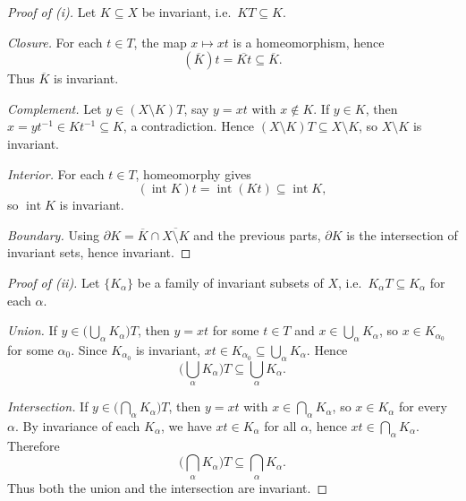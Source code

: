 \begin{mynote}
    \begin{proof}[Proof of (i)]
        Let $K\subseteq X$ be invariant, i.e.\ $K T\subseteq K$.

        \emph{Closure.} For each $t\in T$, the map $x\mapsto xt$ is a homeomorphism, hence
        \[
            (\overline{K})t=\overline{Kt}\subseteq \overline{K}.
        \]
        Thus $\overline{K}$ is invariant.

        \emph{Complement.} Let $y\in (X\setminus K)T$, say $y=xt$ with $x\notin K$. If $y\in K$, then
        $x= y t^{-1}\in Kt^{-1}\subseteq K$, a contradiction. Hence $(X\setminus K)T\subseteq X\setminus K$,
        so $X\setminus K$ is invariant.

        \emph{Interior.} For each $t\in T$, homeomorphy gives
        \[
            (\operatorname{int}K)t=\operatorname{int}(Kt)\subseteq \operatorname{int}K,
        \]
        so $\operatorname{int}K$ is invariant.

        \emph{Boundary.} Using $\partial K=\overline{K}\cap\overline{X\setminus K}$ and the previous parts,
        $\partial K$ is the intersection of invariant sets, hence invariant.
    \end{proof}

    \begin{proof}[Proof of (ii)]
        Let $\{K_\alpha\}$ be a family of invariant subsets of $X$, i.e.\ $K_\alpha T\subseteq K_\alpha$ for each $\alpha$.

        \emph{Union.} If $y\in\bigl(\bigcup_\alpha K_\alpha\bigr)T$, then $y=xt$ for some $t\in T$ and
        $x\in\bigcup_\alpha K_\alpha$, so $x\in K_{\alpha_0}$ for some $\alpha_0$. Since $K_{\alpha_0}$ is invariant,
        $xt\in K_{\alpha_0}\subseteq\bigcup_\alpha K_\alpha$. Hence
        \[
            \bigl(\bigcup_\alpha K_\alpha\bigr)T\subseteq\bigcup_\alpha K_\alpha.
        \]

        \emph{Intersection.} If $y\in\bigl(\bigcap_\alpha K_\alpha\bigr)T$, then $y=xt$ with $x\in\bigcap_\alpha K_\alpha$,
        so $x\in K_\alpha$ for every $\alpha$. By invariance of each $K_\alpha$, we have $xt\in K_\alpha$ for all $\alpha$,
        hence $xt\in\bigcap_\alpha K_\alpha$. Therefore
        \[
            \bigl(\bigcap_\alpha K_\alpha\bigr)T\subseteq\bigcap_\alpha K_\alpha.
        \]
        Thus both the union and the intersection are invariant.
    \end{proof}
\end{mynote}


